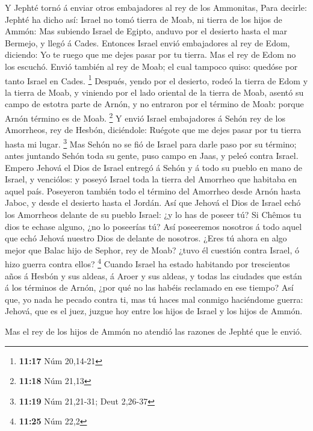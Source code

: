  Y Jephté tornó á enviar otros embajadores al rey de los
Ammonitas,  Para decirle: Jephté ha dicho así: Israel no
tomó tierra de Moab, ni tierra de los hijos de Ammón: 
Mas subiendo Israel de Egipto, anduvo por el desierto hasta el mar
Bermejo, y llegó á Cades.  Entonces Israel envió
embajadores al rey de Edom, diciendo: Yo te ruego que me dejes pasar por
tu tierra. Mas el rey de Edom no los escuchó. Envió también al rey de
Moab; el cual tampoco quiso: quedóse por tanto Israel en Cades.
\footnote{\textbf{11:17} Núm 20,14-21}  Después, yendo
por el desierto, rodeó la tierra de Edom y la tierra de Moab, y viniendo
por el lado oriental de la tierra de Moab, asentó su campo de estotra
parte de Arnón, y no entraron por el término de Moab: porque Arnón
término es de Moab. \footnote{\textbf{11:18} Núm 21,13} 
Y envió Israel embajadores á Sehón rey de los Amorrheos, rey de Hesbón,
diciéndole: Ruégote que me dejes pasar por tu tierra hasta mi lugar.
\footnote{\textbf{11:19} Núm 21,21-31; Deut 2,26-37}  Mas
Sehón no se fió de Israel para darle paso por su término; antes juntando
Sehón toda su gente, puso campo en Jaas, y peleó contra Israel.
 Empero Jehová el Dios de Israel entregó á Sehón y á todo
su pueblo en mano de Israel, y venciólos: y poseyó Israel toda la tierra
del Amorrheo que habitaba en aquel país.  Poseyeron
también todo el término del Amorrheo desde Arnón hasta Jaboc, y desde el
desierto hasta el Jordán.  Así que Jehová el Dios de
Israel echó los Amorrheos delante de su pueblo Israel: ¿y lo has de
poseer tú?  Si Chêmos tu dios te echase alguno, ¿no lo
poseerías tú? Así poseeremos nosotros á todo aquel que echó Jehová
nuestro Dios de delante de nosotros.  ¿Eres tú ahora en
algo mejor que Balac hijo de Sephor, rey de Moab? ¿tuvo él cuestión
contra Israel, ó hizo guerra contra ellos? \footnote{\textbf{11:25} Núm
  22,2}  Cuando Israel ha estado habitando por
trescientos años á Hesbón y sus aldeas, á Aroer y sus aldeas, y todas
las ciudades que están á los términos de Arnón, ¿por qué no las habéis
reclamado en ese tiempo?  Así que, yo nada he pecado
contra ti, mas tú haces mal conmigo haciéndome guerra: Jehová, que es el
juez, juzgue hoy entre los hijos de Israel y los hijos de Ammón.

 Mas el rey de los hijos de Ammón no atendió las razones
de Jephté que le envió.

